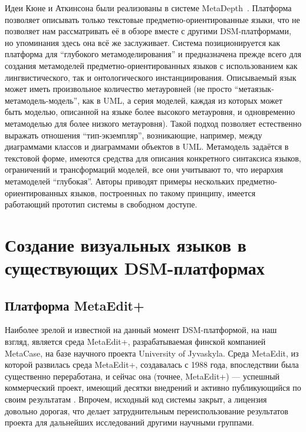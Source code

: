 Идеи Кюне и Аткинсона были реализованы в системе MetaDepth~\cite{de2010deep, de2012domain}. Платформа позволяет описывать
только текстовые предметно-ориентированные языки, что не позволяет нам рассматривать её в обзоре вместе с другими DSM-платформами,
но упоминания здесь она всё же заслуживает. Система позиционируется как платформа для "`глубокого метамоделирования"'
и предназначена прежде всего для создания метамоделей предметно-ориентированных языков с использованием как лингвистического,
так и онтологического инстанциирования. Описываемый язык может иметь произвольное количество метауровней 
(не просто "`метаязык-метамодель-модель"', как в UML, а серия моделей, каждая из которых может быть
моделью, описанной на языке более высокого метауровня, и одновременно метамоделью для более низкого метауровня). Такой
подход позволяет естественно выражать отношения "`тип-экземпляр"', возникающие, например, между диаграммами 
классов и диаграммами объектов в UML. Метамодель задаётся в текстовой форме, имеются средства для описания
конкретного синтаксиса языков, ограничений и трансформаций моделей, все они учитывают то, что иерархия метамоделей "`глубокая"'. 
Авторы приводят примеры нескольких предметно-ориентированных языков, построенных по такому принципу, имеется 
работающий прототип системы в свободном доступе.

\section{Создание визуальных языков в существующих DSM-платформах}
\subsection{Платформа MetaEdit+}
Наиболее зрелой и известной на данный момент DSM-платформой, на наш взгляд, является среда MetaEdit+, 
разрабатываемая финской компанией MetaCase, на базе научного проекта University of Jyvaskyla. 
Среда MetaEdit, из которой развилась среда MetaEdit+, создавалась с 1988 года, впоследствии 
была существенно переработана, и сейчас она (точнее, MetaEdit+) --- успешный коммерческий проект, 
имеющий десятки внедрений и активно публикующийся по своим результатам \cite{kelly2008domain, luoma2004defining, tolvanen2007advanced, tolvanen2009metaedit}. 
Впрочем, исходный код системы закрыт, а лицензия довольно дорогая, что делает затруднительным 
переиспользование результатов проекта для дальнейших исследований другими научными группами.

